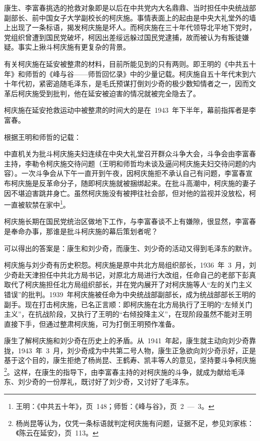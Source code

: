 康生、李富春挑选的抢救对象即是以后在中共党内大名鼎鼎、当时担任中央统战部副部长、前中国女子大学副校长的柯庆施。事情表面上的起由是中央大礼堂外的墙上出现了一条标语，揭发柯庆施是坏人。而柯庆施在三十年代领导北平地下党时，党组织曾遭到国民党破坏，柯因出差绥远躲过国民党逮捕，故而被认为有叛徒嫌疑。事实上揪斗柯庆施有更复杂的背景。

有关柯庆施在延安被整肃的材料，目前所能见到的只有两则。即王明的《中共五十年》和师哲的《峰与谷——师哲回忆录》中的少量记载。柯庆施自五十年代末到六十年代初，紧密追随毛泽东，是毛氏预谋打倒刘少奇的极少数知情者之一，因而文革后柯庆施受到批判，他在延安被迫害的情况就被完全隐去了。

柯庆施在延安抢救运动中被整肃的时间大的是在~1943~年下半年，幕前指挥者是李富春。

根据王明和师哲的记载：

\begin{quoting}
中直机关为批斗柯庆施夫妇连续在中央大礼堂召开群众斗争大会，斗争会由李富春主持，李勒令柯庆施交待问题（王明和师哲均未谈及逼问柯庆施夫妇交待问题的内容）。一次斗争会从下午一直开到午夜，因柯庆施拒不承认自己有问题，李富春宣布柯庆施是反革命分子，随即柯庆施就被捆绑起来。在批斗高潮中，柯庆施的妻子因不堪迫害跳井身亡。虽然柯庆施没有被押往社会部，但对他的监视并没放松，柯一直被软禁在家中\footnote{王明：《中共五十年》，页~148；师哲：《峰与谷》，页~2~—~3。}。
\end{quoting}

柯庆施长期在国民党统治区做地下工作，与李富春谈不上有嫌隙，很显然，李富春是奉命办事，那谁是批斗柯庆施的幕后策划者呢？

可以得出的答案是：康生和刘少奇，而康生、刘少奇的活动又得到毛泽东的默许。

柯庆施与刘少奇有历史积怨。柯庆施是原中共北方局组织部长，1936~年~3~月，刘少奇赴天津担任中共北方局书记，对原北方局进行大改组，任命自己的老部下彭真取代了柯庆施担任北方局组织部长，并在党内展开了对柯庆施等人“左的关门主义错误”的批判。1939~年柯庆施被任命为中央统战部副部长，成为统战部部长王明的副手。现在打击柯庆施，已名正言顺：即柯庆施在北方局执行了王明的“左倾关门主义”，在抗战阶段，又执行了王明的“右倾投降主义”，在现阶段虽然不能对王明直接下手，但通过整肃柯庆施，可为打倒王明预作准备。

康生了解柯庆施和刘少奇在历史上的矛盾。从~1941~年起，康生就主动向刘少奇靠拢，1943~年~3~月，刘少奇成为中共第二号人物，康生正急欲向刘少奇示好，正是基于这个目的，康生拒绝了杨尚昆、王鹤寿、凯丰等人的意见，坚持要斗争柯庆施\footnote{杨尚昆等认为，仅凭一条标语就判定柯庆施有问题，证据不足，参见刘家栋：《陈云在延安》，页~113。}。这样，在康生的指导下，由李富春主持的对柯庆施的斗争，就成为献给毛泽东、刘少奇的一份厚礼，既讨好了刘少奇，又讨好了毛泽东。

